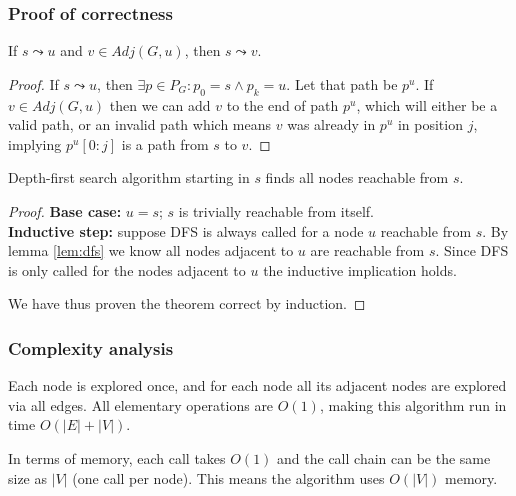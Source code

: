 \subsubsection{Proof of correctness}
\begin{lemma} \label{lem:dfs}
    If $s \leadsto u$ and $v \in Adj(G, u)$, then $s \leadsto v$.
\end{lemma}
\begin{proof}
    If $s \leadsto u$, then $\exists p \in P_G \colon p_0 = s \wedge p_k = u$. Let that path be $p^u$. If $v \in Adj(G, u)$ then we can add $v$ to the end of path $p^u$, which will either be a valid path, or an invalid path which means $v$ was already in $p^u$ in position $j$, implying $p^u[0:j]$ is a path from $s$ to $v$.
\end{proof}
\begin{theorem}
    Depth-first search algorithm starting in $s$ finds all nodes reachable from $s$.
\end{theorem}
\begin{proof} \textbf{Base case:} $u=s$; $s$ is trivially reachable from itself. \\
\textbf{Inductive step:} suppose \textsc{DFS} is always called for a node $u$ reachable from $s$. By lemma \ref{lem:dfs} we know all nodes adjacent to $u$ are reachable from $s$. Since \textsc{DFS} is only called for the nodes adjacent to $u$ the inductive implication holds.\par
We have thus proven the theorem correct by induction.
\end{proof}
\subsubsection{Complexity analysis}
Each node is explored once, and for each node all its adjacent nodes are explored via all edges. All elementary operations are $O(1)$, making this algorithm run in time $O(|E|+|V|)$.\par
In terms of memory, each call takes $O(1)$ and the call chain can be the same size as $|V|$ (one call per node). This means the algorithm uses $O(|V|)$ memory.
